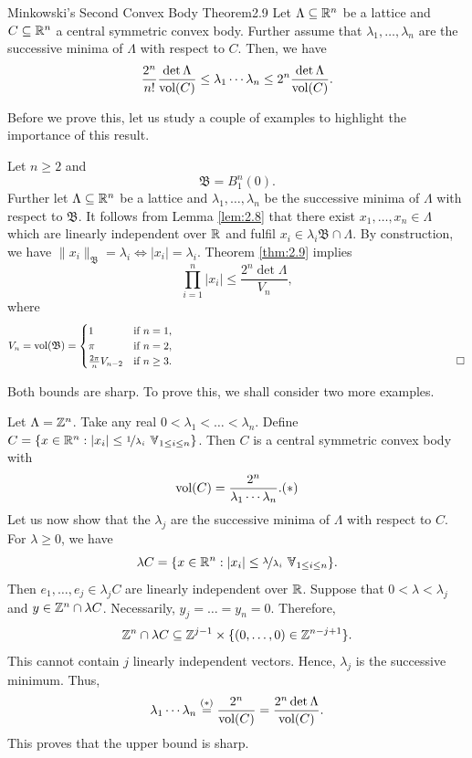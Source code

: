 \documentclass{Vorlesungstemplate_English} %
\begin{document}
    \begin{theorem}{Minkowski's Second Convex Body Theorem}{2.9}
      Let $\Lambda \subseteq \mathbb{R}^n$ be a lattice and $C \subseteq \mathbb{R}^n$ a central symmetric convex body. Further assume that $\lambda_1, \dots, \lambda_n$ are the successive minima of $\Lambda$ with respect to $C$. Then, we have
      \[ \frac{2^n}{n!}\frac{\det\Lambda}{\text{vol}(C)} \leq \lambda_1\cdots\lambda_n \leq 2^n\frac{\det\Lambda}{\text{vol}(C)}.\]
    \end{theorem}
    \noindent Before we prove this, let us study a couple of examples to highlight the importance of this result.
    \begin{example}
      Let $n \geq 2$ and
      \[ \mathfrak B = B_1^n(0).\]
      Further let $\Lambda \subseteq \mathbb{R}^n$ be a lattice and $\lambda_1, \dots, \lambda_n$ be the successive minima of $\Lambda$ with respect to $\mathfrak B$. It follows from Lemma \ref{lem:2.8} that there exist $x_1, \dots, x_n \in \Lambda$ which are linearly independent over $\mathbb{R}$ and fulfil $x_i \in \lambda_i\mathfrak B \cap \Lambda$. By construction, we have $\|x_i\|_{\mathfrak B} = \lambda_i \iff |x_i|=\lambda_i$. Theorem \ref{thm:2.9} implies
      \[ \prod_{i=1}^n |x_i| \leq \frac{2^n\det\Lambda}{V_n},\]
      where
      \[ V_n = \vol(\mathfrak B) = \begin{cases}
        1 & \text{if } n=1, \\
        \pi & \text{if } n=2, \\
        \frac{2\pi}{n}V_{n-2} & \text{if } n \geq 3. \hspace{8.8cm} \qedhere
      \end{cases}\]
    \end{example}
    \noindent Both bounds are sharp. To prove this, we shall consider two more examples.
    \begin{example}
      Let $\Lambda = \mathbb{Z}^n$. Take any real $0 < \lambda_1 < \dots < \lambda_n$. Define $C = \{ x \in \R^n: |x_i| \leq \nicefrac{1}{\lambda_i} \forall_{1 \leq i \leq n}\}$. Then $C$ is a central symmetric convex body with
      \[ \vol(C) = \frac{2^n}{\lambda_1\cdots\lambda_n}. \hfill (*)\]
      Let us now show that the $\lambda_j$ are the successive minima of $\Lambda$ with respect to $C$. For $\lambda \geq 0$, we have
      \[ \lambda C = \{ x \in \R^n: |x_i| \leq \nicefrac{\lambda}{\lambda_i} \forall_{1 \leq i \leq n}\}.\]
      Then $e_1, \dots, e_j \in \lambda_jC$ are linearly independent over $\mathbb{R}$. Suppose that $0 < \lambda < \lambda_j$ and $y \in \mathbb{Z}^n \cap \lambda C$. Necessarily, $y_{j}=\dots=y_n = 0$. Therefore,
      \[ \mathbb{Z}^n \cap \lambda C \subseteq \mathbb{Z}^{j-1} \times \{ (0,\dots, 0) \in \mathbb{Z}^{n-j+1}\}.\]
      This cannot contain $j$ linearly independent vectors. Hence, $\lambda_j$ is the successive minimum. Thus,
      \[ \lambda_1\cdots\lambda_n \stackrel{(*)}{=} \frac{2^n}{\text{vol}(C)} = \frac{2^n\det\Lambda}{\text{vol}(C)}.\]
      This proves that the upper bound is sharp.
    \end{example}
\end{document}
